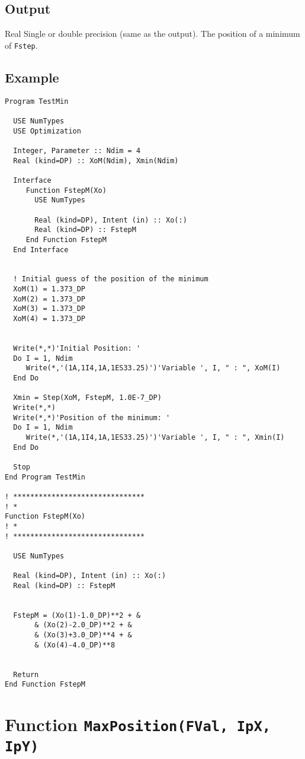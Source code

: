 \subsection{Output}

Real Single or double precision (same as the output). The position of
a minimum of \texttt{Fstep}.

\subsection{Example}

\begin{lstlisting}[emph=Step,
                   emphstyle=\color{blue},
                   frame=trBL,
                   caption=Minimising a function.,
                   label=step]
Program TestMin

  USE NumTypes
  USE Optimization

  Integer, Parameter :: Ndim = 4
  Real (kind=DP) :: XoM(Ndim), Xmin(Ndim)
  
  Interface
     Function FstepM(Xo)
       USE NumTypes
       
       Real (kind=DP), Intent (in) :: Xo(:)
       Real (kind=DP) :: FstepM
     End Function FstepM
  End Interface
  

  ! Initial guess of the position of the minimum
  XoM(1) = 1.373_DP
  XoM(2) = 1.373_DP
  XoM(3) = 1.373_DP
  XoM(4) = 1.373_DP
  

  Write(*,*)'Initial Position: '
  Do I = 1, Ndim
     Write(*,'(1A,1I4,1A,1ES33.25)')'Variable ', I, " : ", XoM(I)
  End Do
  
  Xmin = Step(XoM, FstepM, 1.0E-7_DP)
  Write(*,*)
  Write(*,*)'Position of the minimum: '
  Do I = 1, Ndim
     Write(*,'(1A,1I4,1A,1ES33.25)')'Variable ', I, " : ", Xmin(I)
  End Do

  Stop
End Program TestMin

! *******************************
! *
Function FstepM(Xo)
! *
! *******************************

  USE NumTypes
  
  Real (kind=DP), Intent (in) :: Xo(:)
  Real (kind=DP) :: FstepM

  
  FstepM = (Xo(1)-1.0_DP)**2 + &
       & (Xo(2)-2.0_DP)**2 + &
       & (Xo(3)+3.0_DP)**4 + &
       & (Xo(4)-4.0_DP)**8 


  Return
End Function FstepM
\end{lstlisting}

\section{Function \texttt{MaxPosition(FVal, IpX, IpY) }}

